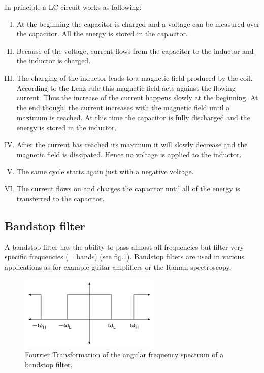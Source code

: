 \documentclass[a4paper,11pt]{article}
\begin{document}
In principle a LC circuit works as following:
\begin{enumerate}[I.]
    \item At the beginning the capacitor is charged and a voltage can be measured over the capacitor. All the energy is stored in the capacitor.
    \item Because of the voltage, current flows from the capacitor to the inductor and the inductor is charged.
    \item The charging of the inductor leads to a magnetic field produced by the coil. According to the Lenz rule this magnetic field acts against the flowing current. Thus the increase of the current happens slowly at the beginning. At the end though, the current increases with the magnetic field until a maximum is reached. At this time the capacitor is fully discharged and the energy is stored in the inductor.
    \item After the current has reached its maximum it will slowly decrease and the magnetic field is dissipated. Hence no voltage is applied to the inductor. 
    \item The same cycle starts again just with a negative voltage.
    \item The current flows on and charges the capacitor until all of the energy is transferred to the capacitor. 

\end{enumerate}
\subsection{Bandstop filter}
A bandstop filter has the ability to pass almost all frequencies but filter very specific frequencies (= bands) (see fig.\ref{fig:bsf}). Bandstop filters are used in various applications as for example guitar amplifiers or the Raman spectroscopy.
\begin{figure}[!ht]

    \includegraphics[width=0.6\textwidth]{images/2880px-Ideal_Band_Stop_Filter_Transfer_Function.svg.png}
    \centering
    \caption{Fourrier Transformation of the angular frequency spectrum of a bandstop filter.}
    \label{fig:bsf}
\end{figure}
\end{document}
